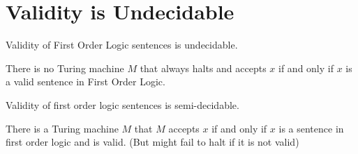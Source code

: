 \section{Validity is Undecidable}

\begin{theorem}
Validity of First Order Logic sentences is undecidable.

There is no Turing machine $M$ that always halts and accepts \(x\) if and only if \(x\) is a valid sentence in First Order Logic.
\end{theorem}

\begin{theorem}
Validity of first order logic sentences is semi-decidable.

There is a Turing machine \(M\) that \(M\) accepts \(x\) if and only if \(x\) is a
sentence in first order logic and is valid. (But might fail to halt if it is not valid)
\end{theorem}


